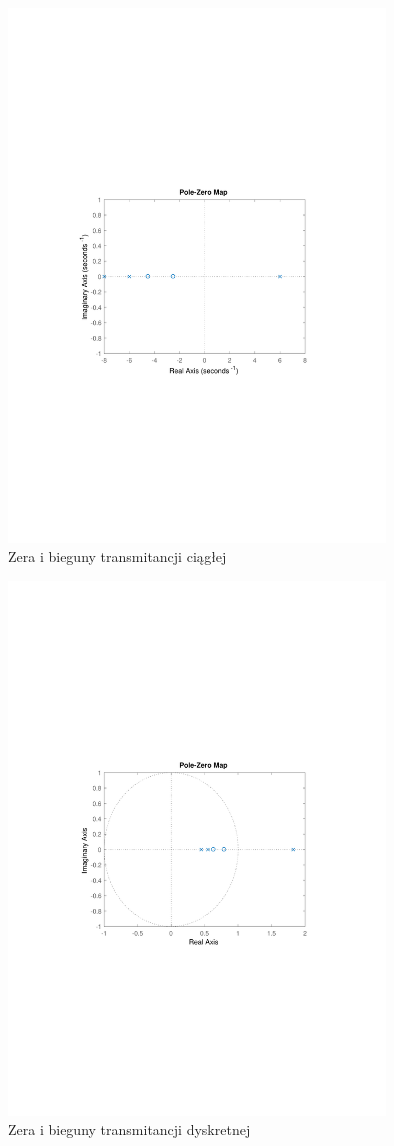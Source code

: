 \documentclass{article}
\begin{document}
\begin{figure}[t]
\centering
\includegraphics[width=10cm]{../rys/rys1}
\caption{Zera i bieguny transmitancji ciągłej}
\label{fig:rys 1}
\end{figure}

\begin{figure}[H]
\centering
\includegraphics[width=10cm]{../rys/rys2}
\caption{Zera i bieguny transmitancji dyskretnej}
\label{fig:rys 2}
\end{figure}
\end{document}
